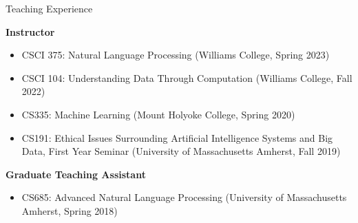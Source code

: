 \documentclass{resume} %
\begin{document}
\begin{rSection}{Teaching Experience}

\textbf{Instructor}
\begin{itemize}
  \item CSCI 375: Natural Language Processing (Williams College, Spring 2023)
  \item CSCI 104: Understanding Data Through Computation (Williams College, Fall 2022)
  \item CS335: Machine Learning (Mount Holyoke College, Spring 2020)
  \item CS191: Ethical Issues Surrounding Artificial Intelligence Systems and Big Data, First Year Seminar (University of Massachusetts Amherst, Fall 2019)

\end{itemize}

\textbf{Graduate Teaching Assistant}
\begin{itemize}
\item CS685: Advanced Natural Language Processing (University of Massachusetts Amherst, Spring 2018)
\end{itemize}






\end{rSection}
\end{document}
